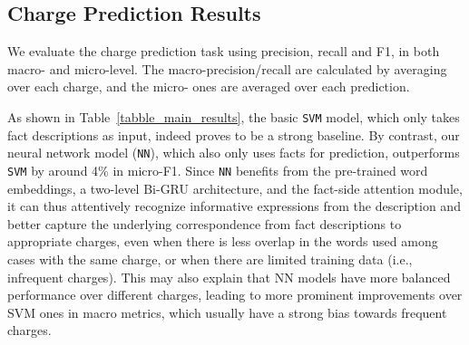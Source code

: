 

\subsection{Charge Prediction Results}
\label{sec_main_results}
We evaluate the charge prediction task using precision, recall and F1, in both macro- and micro-level.
The macro-precision/recall are calculated by averaging over %
each charge, and the micro- ones are averaged  over each prediction. %



As shown in Table~\ref{tabble_main_results}, %
the basic \texttt{SVM} model,
which only takes fact descriptions as input, indeed proves to be a strong baseline.
By contrast, our  neural network model (\texttt{NN}), which also only uses facts for prediction, outperforms \texttt{SVM} 
by around 4\% in micro-F1.
Since \texttt{NN} benefits from the pre-trained word embeddings,
a two-level Bi-GRU architecture, and the fact-side attention module,
it can thus attentively recognize informative expressions from the description and 
better capture the underlying correspondence from fact descriptions to appropriate charges,
even when there is less overlap in the words used among cases with the same charge,
or when there are limited training data (i.e., infrequent charges). This may also explain that NN models 
have more balanced performance over different charges, leading to more prominent improvements over 
SVM ones in macro metrics, which usually have a strong bias towards frequent charges.
%

